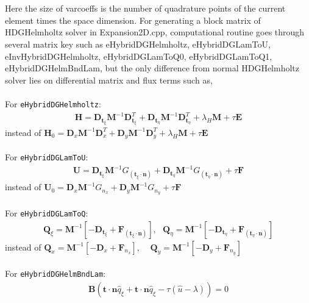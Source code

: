 \documentclass{elsart}
\begin{document}
\\
\\
Here the size of varcoeffs is the number of quadrature points of the current element times the space dimension. For generating a block matrix of HDGHelmholtz solver in Expansion2D.cpp, computational routine goes through several matrix key such as eHybridDGHelmholtz, eHybridDGLamToU, eInvHybridDGHelmholtz, eHybridDGLamToQ0, eHybridDGLamToQ1, eHybridDGHelmBndLam, but the only difference from normal HDGHelmholtz solver lies on differential matrix and flux terms such as, \\
\\
For \texttt{eHybridDGHelmholtz}:
\begin{eqnarray*}
\mathbf{H} = \mathbf{D}_{\mathbf{t}_{\xi}} \mathbf{M}^{-1} \mathbf{D}_{\mathbf{t}_{\xi}}^T +  \mathbf{D}_{\mathbf{t}_{\eta}} \mathbf{M}^{-1} \mathbf{D}_{\mathbf{t}_{\eta}}^T + \lambda_H \mathbf{M} + \tau \mathbf{E}
\end{eqnarray*}
instead of $
\mathbf{H}_0 = \mathbf{D}_x \mathbf{M}^{-1} \mathbf{D}_x^T +  \mathbf{D}_y \mathbf{M}^{-1} \mathbf{D}_y^T + \lambda_H \mathbf{M} + \tau \mathbf{E}
$ \\
\\
For \texttt{eHybridDGLamToU}:
\begin{eqnarray*}
\mathbf{U} = \mathbf{D}_{\mathbf{t}_{\xi}} \mathbf{M}^{-1} G_{(\mathbf{t}_{\xi} \cdot \mathbf{n})} +  \mathbf{D}_{\mathbf{t}_{\eta}} \mathbf{M}^{-1} G_{(\mathbf{t}_{\eta} \cdot \mathbf{n})}  + \tau \mathbf{F}
\end{eqnarray*}
instead of $
\mathbf{U}_0 = \mathbf{D}_x \mathbf{M}^{-1} G_{n_x} +  \mathbf{D}_y \mathbf{M}^{-1} G_{n_y}  + \tau \mathbf{F}
$
\\
\\
For \texttt{eHybridDGLamToQ}:
\begin{eqnarray*}
\mathbf{Q}_{\xi} = \mathbf{M}^{-1} \left [ -   \mathbf{D}_{\mathbf{t}_{\xi}} + \mathbf{F}_{(\mathbf{t}_{\xi} \cdot \mathbf{n} )} \right ],~~~\mathbf{Q}_{\eta} = \mathbf{M}^{-1} \left [ -   \mathbf{D}_{\mathbf{t}_{\eta}} + \mathbf{F}_{(\mathbf{t}_{\eta} \cdot \mathbf{n} )} \right ]
\end{eqnarray*}
instead of $ \mathbf{Q}_x = \mathbf{M}^{-1} \left [ -   \mathbf{D}_x + \mathbf{F}_{n_x} \right ],~~~~~\mathbf{Q}_y = \mathbf{M}^{-1} \left [ -   \mathbf{D}_y + \mathbf{F}_{n_y} \right ] $ \\
\\
For \texttt{eHybridDGHelmBndLam}:
\begin{eqnarray*}
\mathbf{B} \left ( \mathbf{t} \cdot \mathbf{n} \hat{q}_{\xi} +  \mathbf{t} \cdot \mathbf{n} \hat{q}_{\xi} - \tau ( \hat{u} - \lambda ) \right ) = 0
\end{eqnarray*}
\end{document}
